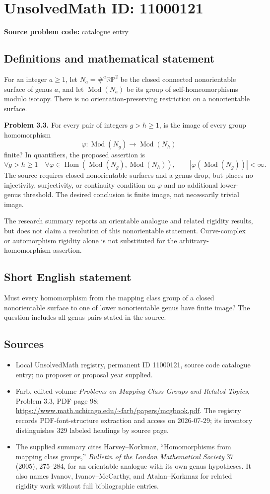 \documentclass[11pt]{article}
\begin{document}
\section*{UnsolvedMath ID: 11000121}
\textbf{Source problem code:} catalogue entry
\subsection{Definitions and mathematical statement}
For an integer $a\ge1$, let $N_a=\#^a\mathbb{RP}^2$ be the closed connected nonorientable surface of genus $a$, and let $\operatorname{Mod}(N_a)$ be its group of self-homeomorphisms modulo isotopy. There is no orientation-preserving restriction on a nonorientable surface.

\textbf{Problem 3.3.} For every pair of integers $g>h\ge1$, is the image of every group homomorphism
\[
 \varphi:\operatorname{Mod}(N_g)\longrightarrow\operatorname{Mod}(N_h)
\]
finite? In quantifiers, the proposed assertion is
\[
 \forall g>h\ge1\quad\forall\varphi\in\operatorname{Hom}(\operatorname{Mod}(N_g),\operatorname{Mod}(N_h)),
 \qquad |\varphi(\operatorname{Mod}(N_g))|<\infty.
\]
The source requires closed nonorientable surfaces and a genus drop, but places no injectivity, surjectivity, or continuity condition on $\varphi$ and no additional lower-genus threshold. The desired conclusion is finite image, not necessarily trivial image.

The research summary reports an orientable analogue and related rigidity results, but does not claim a resolution of this nonorientable statement. Curve-complex or automorphism rigidity alone is not substituted for the arbitrary-homomorphism assertion.
\subsection{Short English statement}
Must every homomorphism from the mapping class group of a closed nonorientable surface to one of lower nonorientable genus have finite image? The question includes all genus pairs stated in the source.
\subsection{Sources}
\begin{itemize}
\item Local UnsolvedMath registry, permanent ID 11000121, source code catalogue entry; no proposer or proposal year supplied.
\item Farb, edited volume \emph{Problems on Mapping Class Groups and Related Topics}, Problem 3.3, PDF page 98; \url{https://www.math.uchicago.edu/~farb/papers/mcgbook.pdf}. The registry records PDF-font-structure extraction and access on 2026-07-29; its inventory distinguishes 329 labeled headings by source page.
\item The supplied summary cites Harvey--Korkmaz, ``Homomorphisms from mapping class groups,'' \emph{Bulletin of the London Mathematical Society} 37 (2005), 275--284, for an orientable analogue with its own genus hypotheses. It also names Ivanov, Ivanov--McCarthy, and Atalan--Korkmaz for related rigidity work without full bibliographic entries.
\end{itemize}
\end{document}
